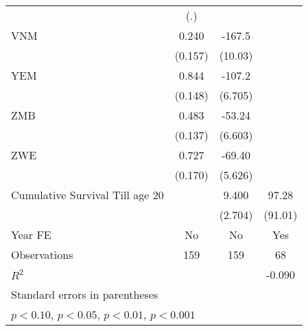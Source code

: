 \begin{table}[htbp]
\begin{tabular}{l*{3}{c}}
                &      (.)         &                  &                  \\
\addlinespace
VNM             &    0.240         &   -167.5\sym{***}&                  \\
                &  (0.157)         &  (10.03)         &                  \\
\addlinespace
YEM             &    0.844\sym{***}&   -107.2\sym{***}&                  \\
                &  (0.148)         &  (6.705)         &                  \\
\addlinespace
ZMB             &    0.483\sym{***}&   -53.24\sym{***}&                  \\
                &  (0.137)         &  (6.603)         &                  \\
\addlinespace
ZWE             &    0.727\sym{***}&   -69.40\sym{***}&                  \\
                &  (0.170)         &  (5.626)         &                  \\
\addlinespace
Cumulative Survival Till age 20&                  &    9.400\sym{***}&    97.28         \\
                &                  &  (2.704)         &  (91.01)         \\
\addlinespace
Year FE         &       No         &       No         &      Yes         \\
\midrule
Observations    &      159         &      159         &       68         \\
\(R^{2}\)       &                  &                  &   -0.090         \\
\bottomrule
\multicolumn{4}{l}{\footnotesize Standard errors in parentheses}\\
\multicolumn{4}{l}{\footnotesize \sym{+} \(p<0.10\), \sym{*} \(p<0.05\), \sym{**} \(p<0.01\), \sym{***} \(p<0.001\)}\\
\end{tabular}
\end{table}
